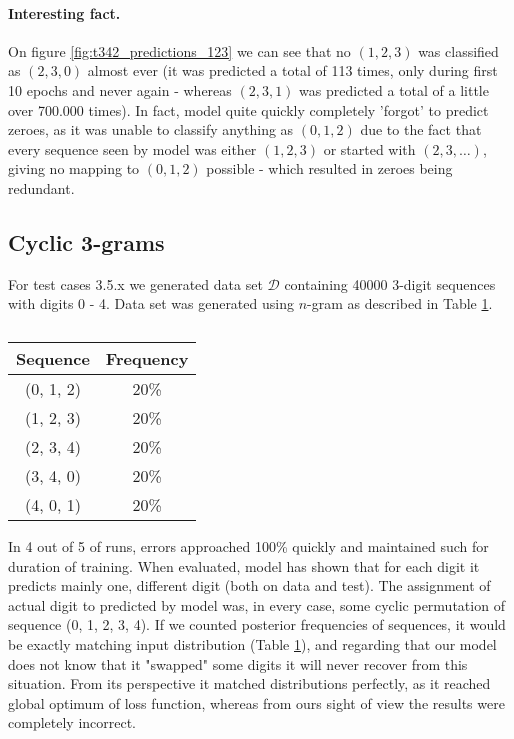 \documentclass[shortabstract,lic,english]{iithesis}
\begin{document}
\paragraph{Interesting fact.} On figure \ref{fig:t342_predictions_123} we can see that no $(1, 2, 3)$ was classified as $(2, 3, 0)$ almost ever (it was predicted a total of 113 times, only during first 10 epochs and never again - whereas $(2, 3, 1)$ was predicted a total of a little over 700.000 times). In fact, model quite quickly completely 'forgot' to predict zeroes, as it was unable to classify anything as $(0, 1, 2)$ due to the fact that every sequence seen by model was either $(1, 2, 3)$ or started with $(2, 3, \dots)$, giving no mapping to $(0, 1, 2)$ possible - which resulted in zeroes being redundant.



\subsection{Cyclic 3-grams}

For test cases 3.5.x we generated data set $\mathcal{D}$ containing 40000 3-digit sequences with digits 0 - 4. Data set was generated using $n$-gram as described in Table \ref{tab:cyclic_test}.

\begin{table}[htbp]
\centering
\begin{tabular}{c|c}
    Sequence & Frequency \\
    \hline
    (0, 1, 2) & 20\% \\
    (1, 2, 3) & 20\% \\
    (2, 3, 4) & 20\% \\
    (3, 4, 0) & 20\% \\
    (4, 0, 1) & 20\% \\
\end{tabular}
\caption{}
\label{tab:cyclic_test}
\end{table}

In 4 out of 5 of runs, errors approached 100\% quickly and maintained such for duration of training. When evaluated, model has shown that for each digit it predicts mainly one, different digit (both on data and test). The assignment of actual digit to predicted by model was, in every case, some cyclic permutation of sequence (0, 1, 2, 3, 4). If we counted posterior frequencies of sequences, it would be exactly matching input distribution (Table \ref{tab:cyclic_test}), and regarding that our model does not know that it "swapped" some digits it will never recover from this situation. From its perspective it matched distributions perfectly, as it reached global optimum of loss function, whereas from ours sight of view the results were completely incorrect.
\end{document}
